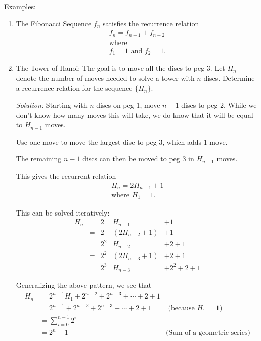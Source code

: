 \documentclass[a4paper,10pt]{report}
\begin{document}
Examples:
\begin{enumerate}
	\item
		The Fibonacci Sequence ${f_n}$ satisfies the recurrence relation
		\begin{gather*}
			f_n = f_{n-1} + f_{n-2} \\
			\text{where } \\
			f_1 = 1 \text{ and } f_2 = 1.
		\end{gather*}
	\item
		The Tower of Hanoi: The goal is to move all the discs to peg 3. Let $H_n$ denote the number of moves needed to solve a tower with $n$ discs. Determine a recurrence relation for the sequence $\{H_n\}$.

		\textit{Solution:}
		Starting with $n$ discs on peg 1, move $n-1$ discs to peg 2. While we don't know how many moves this will take, we do know that it will be equal to $H_{n-1}$ moves.

		Use one move to move the largest disc to peg 3, which adds 1 move.

		The remaining $n-1$ discs can then be moved to peg 3 in $H_{n-1}$ moves.

		This gives the recurrent relation
		\begin{gather*}
			H_n = 2H_{n-1} + 1 \\
			\text{where } H_1 = 1.
		\end{gather*}

		This can be solved iteratively:
		\begin{align*}
			H_n &= &2   &H_{n-1} 			&+ 1 			\\
				&= &2   &(2H_{n-2} + 1) 	&+ 1 			\\
				&= &2^2 &H_{n-2} 			&+ 2 + 1 		\\
				&= &2^2 &(2H_{n-3} + 1) 	&+ 2 + 1 		\\
				&= &2^3 &H_{n-3}			&+ 2^2 + 2 + 1
		\end{align*}

		Generalizing the above pattern, we see that
		\begin{align*}
			H_n &= 2^{n-1}H_1 + 2^{n-2} + 2^{n-3}+\cdots+2+1							\\
				&= 2^{n-1} + 2^{n-2} + 2^{n-3}+\cdots+2+1 &\text{ (because $H_1$ = 1)} 	\\
				&= \sum_{i=0}^{n-1} 2^i \\
				&= 2^n - 1 &\text{(Sum of a geometric series)}  %
		\end{align*}
\end{enumerate}
\end{document}
